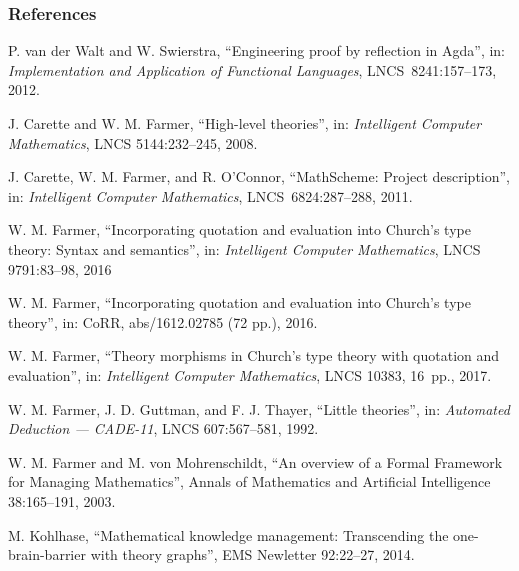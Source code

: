 \documentclass[t,12pt,numbers,fleqn]{beamer}
\begin{document}
\begin{frame}\label{lastframe}
\frametitle{References}
\scriptsize
\bi

  \item \bbrown{[WS12]} P. van der Walt and W. Swierstra,
    ``Engineering proof by reflection in Agda'', in:
    \emph{Implementation and Application of Functional Languages},
    LNCS~8241:157--173, 2012.

  \item \bbrown{[CF08]} J. Carette and W. M. Farmer, ``High-level
    theories'', in: \emph{Intelligent Computer Mathematics}, LNCS
    5144:232--245, 2008.

  \item \bbrown{[CFO11]} J. Carette, W. M. Farmer, and R. O'Connor,
    ``MathScheme: Project description'', in: \emph{Intelligent
    Computer Mathematics}, LNCS~6824:287--288, 2011.

  \item \bbrown{[Far16]} W. M. Farmer, ``Incorporating quotation and
    evaluation into Church's type theory: Syntax and semantics'', in:
    \emph{Intelligent Computer Mathematics}, LNCS 9791:83--98, 2016

  \item \bbrown{[Far16a]} W. M. Farmer, ``Incorporating quotation and
    evaluation into Church's type theory'', in: CoRR, abs/1612.02785
    (72 pp.), 2016.

  \item \bbrown{[Far17]} W. M. Farmer, ``Theory morphisms in Church's
    type theory with quotation and evaluation'', in: \emph{Intelligent
      Computer Mathematics}, LNCS 10383, 16~pp., 2017.

  \item \bbrown{[FGT92]} W. M. Farmer, J. D. Guttman, and
    F. J. Thayer, ``Little theories'', in: \emph{Automated Deduction
      --- CADE-11}, LNCS 607:567--581, 1992.

  \item \bbrown{[FM03]} W. M. Farmer and M. von Mohrenschildt, ``An
    overview of a Formal Framework for Managing Mathematics'', Annals
    of Mathematics and Artificial Intelligence 38:165--191, 2003.

  \item \bbrown{[Kol14]} M. Kohlhase, ``Mathematical knowledge
    management: Transcending the one-brain-barrier with theory
    graphs'', EMS Newletter 92:22--27, 2014.

\ei
\end{frame}


\iffalse

\begin{frame}
\frametitle{}
\bi

  \item 

\ei
\end{frame}

\fi
\end{document}
